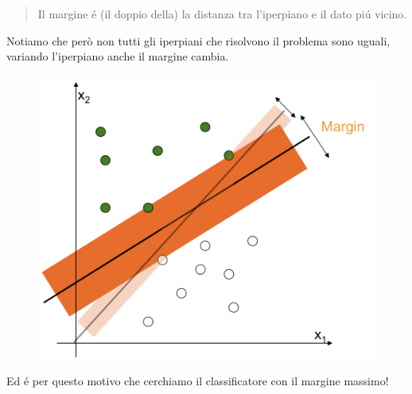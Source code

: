 \documentclass{article}
\begin{document}
\begin{quote}
    Il margine é (il doppio della) la distanza tra l'iperpiano e il dato piú vicino.
\end{quote}
Notiamo che però non tutti gli iperpiani che risolvono il problema sono uguali, variando l'iperpiano anche il margine cambia.
\begin{figure}[H]
\centering
\includegraphics[scale=0.4]{Images/svmbigmargin.png}
\end{figure}
Ed é per questo motivo che cerchiamo il classificatore con il margine massimo!
\end{document}
